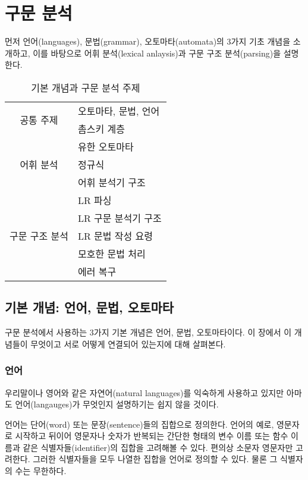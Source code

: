 \documentclass[a4paper]{book}
\begin{document}
\chapter{구문 분석}

먼저 언어(languages), 문법(grammar), 오토마타(automata)의 3가지 기초
개념을 소개하고, 이를 바탕으로 어휘 분석(lexical anlaysis)과 구문 구조
분석(parsing)을 설명한다.

\begin{table}[ht]
\begin{center}
\begin{tabular}{|c|l|} \hline
  \multirow{2}{*}{공통 주제}
    & 오토마타, 문법, 언어 \\ \cline{2-2}
    & 촘스키 계층 \\ \hline
  \multirow{3}{*}{어휘 분석} & 유한 오토마타 \\ \cline{2-2}
    & 정규식 \\ \cline{2-2}
    & 어휘 분석기 구조 \\ \hline
  \multirow{5}{*}{구문 구조 분석}
    & LR 파싱 \\ \cline{2-2}
    & LR 구문 분석기 구조 \\ \cline{2-2}
    & LR 문법 작성 요령 \\ \cline{2-2}
    & 모호한 문법 처리 \\ \cline{2-2}
    & 에러 복구 \\ \hline
\end{tabular}
\caption{기본 개념과 구문 분석 주제}
\label{table:syntaxanalysis}
\end{center}
\end{table}


\section{기본 개념: 언어, 문법, 오토마타}


구문 분석에서 사용하는 3가지 기본 개념은 언어, 문법, 오토마타이다. 이
장에서 이 개념들이 무엇이고 서로 어떻게 연결되어 있는지에 대해 살펴본다.

\subsection{언어}
\label{subsec:language}


우리말이나 영어와 같은 자연어(natural languages)를 익숙하게 사용하고
있지만 아마도 언어(langauges)가 무엇인지 설명하기는 쉽지 않을 것이다.

언어는 단어(word) 또는 문장(sentence)들의 집합으로 정의한다. 언어의
예로, 영문자로 시작하고 뒤이어 영문자나
숫자가 반복되는 간단한 형태의 변수 이름 또는 함수 이름과 같은
식별자들(identifier)의 집합을 고려해볼 수 있다.
%
편의상 소문자 영문자만 고려한다. 그러한 식별자들을 모두 나열한 집합을
언어로 정의할 수 있다. 물론 그 식별자의 수는 무한하다.
\end{document}
